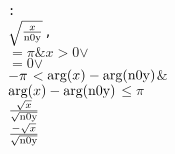 \begin{alltt}
  : 
    \pvsid{(}\(\sqrtonefn{\opdividetwofn{x}{\pvsid{n0y}}}\),
           \pvsid{(}\pvsid{(}\pvsid{)} \(=\) \(\pi\) \(\&\) \pvsid{(}\(x\)\pvsid{)} \(>\) \(0\)\pvsid{)} \(\vee\)
              \pvsid{(}\pvsid{)} \(=\) \(0\) \(\vee\)
               \pvsid{(}\(\opdifferenceonefn{\pi}\) \(<\) \(\opdifferencetwofn{\pvsid{arg}\pvsid{(}x\pvsid{)}}{\pvsid{arg}\pvsid{(}\pvsid{n0y}\pvsid{)}}\) \(\&\)
                  \(\opdifferencetwofn{\pvsid{arg}\pvsid{(}x\pvsid{)}}{\pvsid{arg}\pvsid{(}\pvsid{n0y}\pvsid{)}}\) \(\leq\) \(\pi\)\pvsid{)}
             \(\opdividetwofn{\sqrtonefn{x}}{\sqrtonefn{\pvsid{n0y}}}\)
           \(\opdividetwofn{\opdifferenceonefn{\sqrtonefn{x}}}{\sqrtonefn{\pvsid{n0y}}}\)
          \pvsid{)}\vspace*{\pvsdeclspacing}

  \end{alltt}
